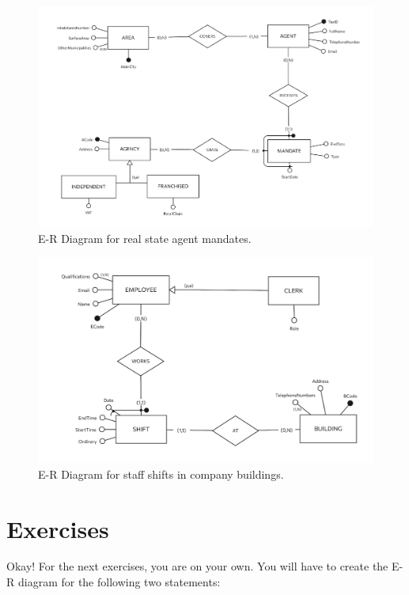 \documentclass{article}
\begin{document}
\begin{figure}[t]
    \centering
    \includegraphics[width=\textwidth]{figures/agents.png}
    \caption{E-R Diagram for real state agent mandates.}
    \label{fig:agents}
\end{figure}

\begin{figure}[b]
    \centering
    \includegraphics[width=\textwidth]{figures/shifts.png}
    \caption{E-R Diagram for staff shifts in company buildings.}
    \label{fig:shifts}
\end{figure}

\section{Exercises} \label{sec:exercises}
Okay! For the next exercises, you are on your own. You will have to create the E-R diagram for the following two statements:
\end{document}
